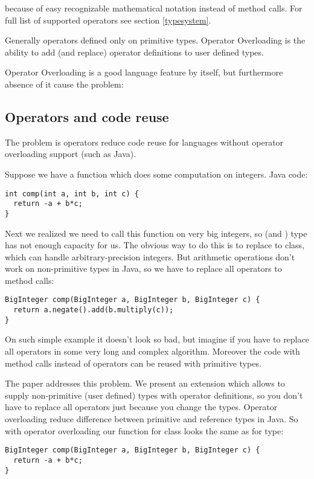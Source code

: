 \documentclass{aircc}
\begin{document}
because of easy recognizable mathematical notation instead of method calls. For full list of supported operators see section \ref{typesystem}.

Generally operators defined only on primitive types.
Operator Overloading is the ability to add (and replace) operator definitions to user defined types.

Operator Overloading is a good language feature by itself,
but furthermore absence of it cause the problem:

\subsection{Operators and code reuse \label{codereuse}}
The problem is operators reduce code reuse for languages without operator overloading support (such as Java).

Suppose we have a function which does some computation on integers. Java code:
\begin{lstlisting}
int comp(int a, int b, int c) {
  return -a + b*c;
}
\end{lstlisting}
Next we realized we need to call this function on very big integers, so  (and ) type has not enough capacity for us.
The obvious way to do this is to replace  to  class, which can handle arbitrary-precision integers.
But arithmetic operations don't work on non-primitive types in Java,
so we have to replace all operators to method calls:
\begin{lstlisting}
BigInteger comp(BigInteger a, BigInteger b, BigInteger c) {
  return a.negate().add(b.multiply(c));
}
\end{lstlisting}
On such simple example it doesn't look so bad, but imagine if you have to replace all operators in some very long and complex algorithm.
Moreover the code with method calls instead of operators can be reused with primitive types.

The paper addresses this problem. We present an extension which allows to supply non-primitive (user defined) types
with operator definitions, so you don't have to replace all operators just because you change the types.
Operator overloading reduce difference between primitive and reference types in Java.
So with operator overloading our  function for  class looks the same as for  type:
\begin{lstlisting}
BigInteger comp(BigInteger a, BigInteger b, BigInteger c) {
  return -a + b*c;
}
\end{lstlisting}
\end{document}
